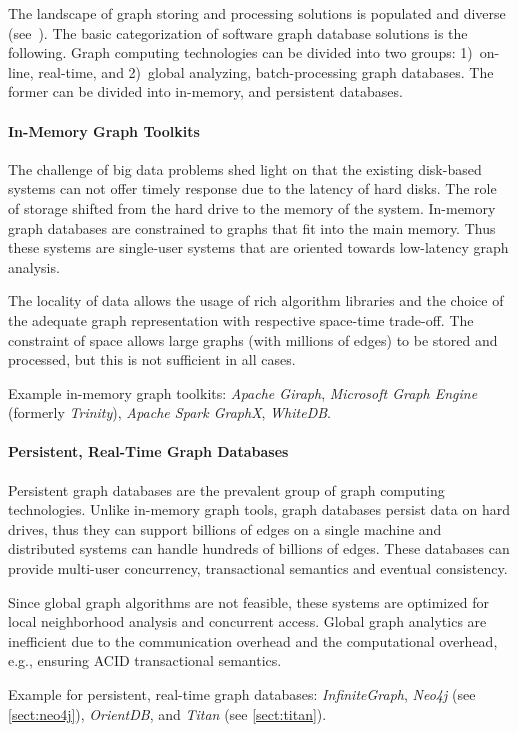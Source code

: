 The landscape of graph storing and processing solutions is populated and diverse (see~\cite{zhang_-memory_2015}). The basic categorization of software graph database solutions is the following. Graph computing technologies can be divided into two groups: 1)~on-line, real-time, and 2)~global analyzing, batch-processing graph databases. The former can be divided into in-memory, and persistent databases.

\paragraph{In-Memory Graph Toolkits}
The challenge of big data problems shed light on that the existing disk-based systems can not offer timely response due to the latency of hard disks. The role of storage shifted from the hard drive to the memory of the system. In-memory graph databases are constrained to graphs that fit into the main memory. Thus these systems are single-user systems that are oriented towards low-latency graph analysis.

The locality of data allows the usage of rich algorithm libraries and the choice of the adequate graph representation with respective space-time trade-off. The constraint of space allows large graphs (with millions of edges) to be stored and processed, but this is not sufficient in all cases.

Example in-memory graph toolkits: \emph{Apache Giraph}, \emph{Microsoft Graph Engine} (formerly \emph{Trinity}), \emph{Apache Spark GraphX}, \emph{WhiteDB}.

\paragraph{Persistent, Real-Time Graph Databases}
Persistent graph databases are the prevalent group of graph computing technologies. Unlike in-memory graph tools, graph databases persist data on hard drives, thus they can support billions of edges on a single machine and distributed systems can handle hundreds of billions of edges. These databases can provide multi-user concurrency, transactional semantics and eventual consistency.

Since global graph algorithms are not feasible, these systems are optimized for local neighborhood analysis and concurrent access. Global graph analytics are inefficient due to the communication overhead and the computational overhead, e.g., ensuring ACID transactional semantics.

Example for persistent, real-time graph databases: \emph{InfiniteGraph}, \emph{Neo4j} (see \cref{sect:neo4j}), \emph{OrientDB}, and \emph{Titan} (see \cref{sect:titan}).


